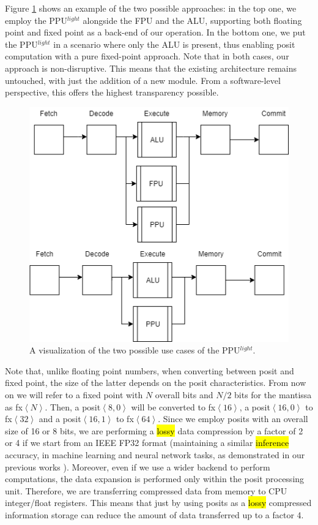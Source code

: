 Figure \ref{fig:use_cases} shows an example of the two possible approaches: in the top one, we employ the PPU$^{light}$ alongside the  FPU  and  the  ALU,  supporting  both  floating  point  and fixed  point  as  a  back-end  of  our  operation.  In  the  bottom one, we put the  PPU$^{light}$ in a scenario where only the ALU is present, thus enabling posit computation with a pure fixed-point approach. Note that in both cases, our approach is non-disruptive. This means that the existing architecture remains untouched, with just the addition of a new module. From a software-level perspective, this offers the highest transparency possible.
\begin{figure}
    \centering
    \includegraphics[width=0.5\linewidth]{img/use_cases.png}
    \caption{A visualization of the two possible use cases of the PPU$^{light}$. }
    \label{fig:use_cases}
\end{figure}
Note that, unlike floating point numbers, when converting between posit and fixed point, the size of the latter depends on the posit characteristics. From now on we will refer to  a fixed point with $N$ overall bits and $N/2$ bits for the mantissa  as fx$\left<N\right>$. Then, a posit$\left<8,0\right>$ will be converted to fx$\left<16\right>$,  a posit$\left<16,0\right>$ to fx$\left<32\right>$ and a posit$\left<16,1\right>$ to fx$\left<64\right>$.
Since we employ posits with an overall size of 16 or 8 bits, we are performing a \hl{lossy} data compression by a factor of 2 or 4 if we start from an IEEE FP32 format (maintaining a similar \hl{inference} accuracy, in machine learning and neural network tasks, as demonstrated in our previous works \cite{coco_et_al_ieeespm_2020,coco2020sensors}). Moreover, even if we use a wider backend to perform computations, the data expansion is performed only within the posit processing unit. Therefore, we are transferring compressed data from memory to CPU integer/float registers. This means that just by using posits as a \hl{lossy} compressed information storage can reduce the amount of data transferred up to a factor 4.
